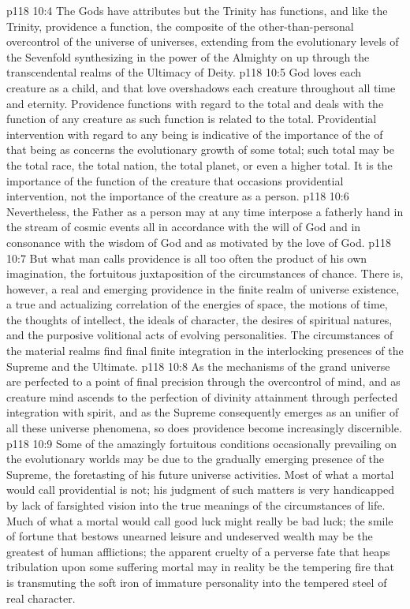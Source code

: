 \vs p118 10:4 The Gods have attributes but the Trinity has functions, and like the Trinity, providence  a function, the composite of the other\hyp{}than\hyp{}personal overcontrol of the universe of universes, extending from the evolutionary levels of the Sevenfold synthesizing in the power of the Almighty on up through the transcendental realms of the Ultimacy of Deity.
\pc \vs p118 10:5 God loves each creature as a child, and that love overshadows each creature throughout all time and eternity. Providence functions with regard to the total and deals with the function of any creature as such function is related to the total. Providential intervention with regard to any being is indicative of the importance of the  of that being as concerns the evolutionary growth of some total; such total may be the total race, the total nation, the total planet, or even a higher total. It is the importance of the function of the creature that occasions providential intervention, not the importance of the creature as a person.
\vs p118 10:6 Nevertheless, the Father as a person may at any time interpose a fatherly hand in the stream of cosmic events all in accordance with the will of God and in consonance with the wisdom of God and as motivated by the love of God.
\vs p118 10:7 But what man calls providence is all too often the product of his own imagination, the fortuitous juxtaposition of the circumstances of chance. There is, however, a real and emerging providence in the finite realm of universe existence, a true and actualizing correlation of the energies of space, the motions of time, the thoughts of intellect, the ideals of character, the desires of spiritual natures, and the purposive volitional acts of evolving personalities. The circumstances of the material realms find final finite integration in the interlocking presences of the Supreme and the Ultimate.
\vs p118 10:8 As the mechanisms of the grand universe are perfected to a point of final precision through the overcontrol of mind, and as creature mind ascends to the perfection of divinity attainment through perfected integration with spirit, and as the Supreme consequently emerges as an  unifier of all these universe phenomena, so does providence become increasingly discernible.
\vs p118 10:9 Some of the amazingly fortuitous conditions occasionally prevailing on the evolutionary worlds may be due to the gradually emerging presence of the Supreme, the foretasting of his future universe activities. Most of what a mortal would call providential is not; his judgment of such matters is very handicapped by lack of farsighted vision into the true meanings of the circumstances of life. Much of what a mortal would call good luck might really be bad luck; the smile of fortune that bestows unearned leisure and undeserved wealth may be the greatest of human afflictions; the apparent cruelty of a perverse fate that heaps tribulation upon some suffering mortal may in reality be the tempering fire that is transmuting the soft iron of immature personality into the tempered steel of real character.
